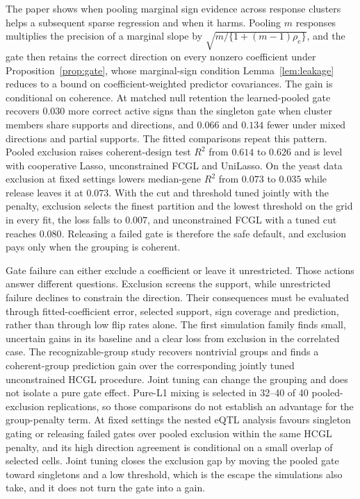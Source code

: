 \documentclass[lineno,pdflatex,sn-basic]{sn-jnl}
\theoremstyle{thmstyleone}
\begin{document}
The paper shows when pooling marginal sign evidence across response clusters
helps a subsequent sparse regression and when it harms. Pooling $m$ responses
multiplies the precision of a marginal slope by
$\sqrt{m/\{1+(m-1)\rho_e\}}$, and the gate then retains the correct direction
on every nonzero coefficient under Proposition~\ref{prop:gate}, whose
marginal-sign condition Lemma~\ref{lem:leakage} reduces to a bound on
coefficient-weighted predictor covariances. The gain is conditional on
coherence. At matched null retention the learned-pooled gate recovers $0.030$
more correct active signs than the singleton gate when cluster members share
supports and directions, and $0.066$ and $0.134$ fewer under mixed directions
and partial supports. The fitted comparisons repeat this pattern. Pooled
exclusion raises coherent-design test $R^2$ from $0.614$ to $0.626$ and is
level with cooperative Lasso, unconstrained FCGL and UniLasso. On the yeast
data exclusion at fixed settings lowers median-gene $R^2$ from $0.073$ to
$0.035$ while release leaves it at $0.073$. With the cut and threshold tuned
jointly with the penalty, exclusion selects the finest partition and the
lowest threshold on the grid in every fit, the loss falls to $0.007$, and
unconstrained FCGL with a tuned cut reaches $0.080$. Releasing a failed gate
is therefore the safe default, and exclusion pays only when the grouping is
coherent.

Gate failure can either exclude a coefficient or leave it unrestricted. Those
actions answer different questions. Exclusion screens the support, while
unrestricted failure declines to constrain the direction. Their consequences
must be evaluated through fitted-coefficient error, selected support, sign
coverage and prediction, rather than through low flip rates alone. The first
simulation family finds small, uncertain gains in its baseline and a clear loss
from exclusion in the correlated case. The recognizable-group study recovers
nontrivial groups and finds a coherent-group prediction gain over the
corresponding jointly tuned unconstrained HCGL procedure. Joint tuning can
change the grouping and does not isolate a pure gate effect. Pure-L1 mixing is
selected in 32--40 of 40 pooled-exclusion replications, so those comparisons do
not establish an advantage for the group-penalty term. At fixed settings the
nested eQTL analysis favours singleton gating or releasing failed gates over
pooled exclusion within the same HCGL penalty, and its high direction
agreement is conditional on a small overlap of selected cells. Joint tuning
closes the exclusion gap by moving the pooled gate toward singletons and a low
threshold, which is the escape the simulations also take, and it does not
turn the gate into a gain.
\end{document}
